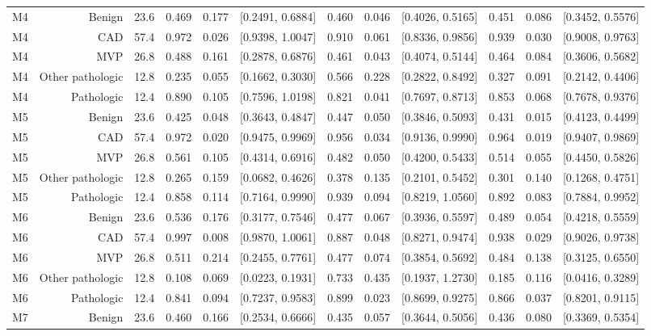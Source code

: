 \begin{table}[htbp]
\begin{tabular}{lrrrrrrrrrrr}
    M4 & Benign & 23.6 & 0.469 & 0.177 & [0.2491, 0.6884] & 0.460 & 0.046 & [0.4026, 0.5165] & 0.451 & 0.086 & [0.3452, 0.5576] \\
    M4 & CAD & 57.4 & 0.972 & 0.026 & [0.9398, 1.0047] & 0.910 & 0.061 & [0.8336, 0.9856] & 0.939 & 0.030 & [0.9008, 0.9763] \\
    M4 & MVP & 26.8 & 0.488 & 0.161 & [0.2878, 0.6876] & 0.461 & 0.043 & [0.4074, 0.5144] & 0.464 & 0.084 & [0.3606, 0.5682] \\
    M4 & Other pathologic & 12.8 & 0.235 & 0.055 & [0.1662, 0.3030] & 0.566 & 0.228 & [0.2822, 0.8492] & 0.327 & 0.091 & [0.2142, 0.4406] \\
    M4 & Pathologic & 12.4 & 0.890 & 0.105 & [0.7596, 1.0198] & 0.821 & 0.041 & [0.7697, 0.8713] & 0.853 & 0.068 & [0.7678, 0.9376] \\
    M5 & Benign & 23.6 & 0.425 & 0.048 & [0.3643, 0.4847] & 0.447 & 0.050 & [0.3846, 0.5093] & 0.431 & 0.015 & [0.4123, 0.4499] \\
    M5 & CAD & 57.4 & 0.972 & 0.020 & [0.9475, 0.9969] & 0.956 & 0.034 & [0.9136, 0.9990] & 0.964 & 0.019 & [0.9407, 0.9869] \\
    M5 & MVP & 26.8 & 0.561 & 0.105 & [0.4314, 0.6916] & 0.482 & 0.050 & [0.4200, 0.5433] & 0.514 & 0.055 & [0.4450, 0.5826] \\
    M5 & Other pathologic & 12.8 & 0.265 & 0.159 & [0.0682, 0.4626] & 0.378 & 0.135 & [0.2101, 0.5452] & 0.301 & 0.140 & [0.1268, 0.4751] \\
    M5 & Pathologic & 12.4 & 0.858 & 0.114 & [0.7164, 0.9990] & 0.939 & 0.094 & [0.8219, 1.0560] & 0.892 & 0.083 & [0.7884, 0.9952] \\
    M6 & Benign & 23.6 & 0.536 & 0.176 & [0.3177, 0.7546] & 0.477 & 0.067 & [0.3936, 0.5597] & 0.489 & 0.054 & [0.4218, 0.5559] \\
    M6 & CAD & 57.4 & 0.997 & 0.008 & [0.9870, 1.0061] & 0.887 & 0.048 & [0.8271, 0.9474] & 0.938 & 0.029 & [0.9026, 0.9738] \\
    M6 & MVP & 26.8 & 0.511 & 0.214 & [0.2455, 0.7761] & 0.477 & 0.074 & [0.3854, 0.5692] & 0.484 & 0.138 & [0.3125, 0.6550] \\
    M6 & Other pathologic & 12.8 & 0.108 & 0.069 & [0.0223, 0.1931] & 0.733 & 0.435 & [0.1937, 1.2730] & 0.185 & 0.116 & [0.0416, 0.3289] \\
    M6 & Pathologic & 12.4 & 0.841 & 0.094 & [0.7237, 0.9583] & 0.899 & 0.023 & [0.8699, 0.9275] & 0.866 & 0.037 & [0.8201, 0.9115] \\
    M7 & Benign & 23.6 & 0.460 & 0.166 & [0.2534, 0.6666] & 0.435 & 0.057 & [0.3644, 0.5056] & 0.436 & 0.080 & [0.3369, 0.5354] \\

\end{tabular}
\end{table}
